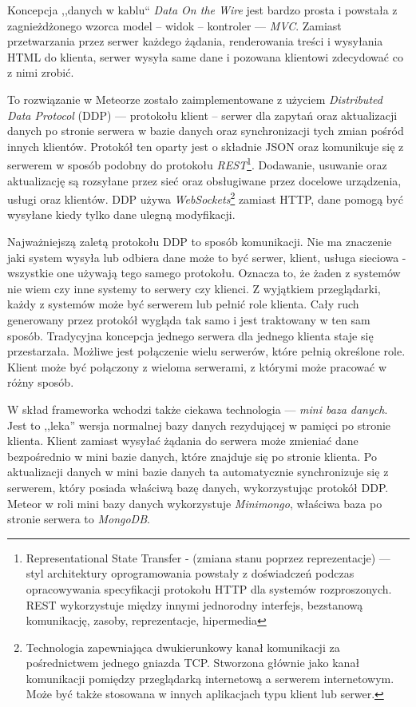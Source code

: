Koncepcja ,,danych w kablu`` \emph{Data On the Wire} jest bardzo prosta i powstała z zagnieżdżonego wzorca model -- widok -- kontroler --- \textit{MVC}. Zamiast przetwarzania przez serwer każdego żądania, renderowania treści i wysyłania HTML do klienta, serwer wysyła same dane i pozowana klientowi zdecydować co z nimi zrobić\cite{strack15}.

To rozwiązanie w Meteorze zostało zaimplementowane z użyciem \emph{Distributed Data Protocol} (DDP) --- protokołu klient -- serwer dla zapytań oraz aktualizacji danych po stronie serwera w bazie danych oraz synchronizacji tych zmian pośród innych klientów. Protokół ten oparty jest o składnie JSON oraz komunikuje się z serwerem w sposób podobny do protokołu \emph{REST}\footnote{Representational State Transfer - (zmiana stanu poprzez reprezentacje) --- styl architektury oprogramowania powstały z doświadczeń podczas opracowywania specyfikacji protokołu HTTP dla systemów rozproszonych. REST wykorzystuje między innymi jednorodny interfejs, bezstanową komunikację, zasoby, reprezentacje, hipermedia\cite{restWiki}}. Dodawanie, usuwanie oraz aktualizację są rozsyłane przez sieć oraz obsługiwane przez docelowe urządzenia, usługi oraz klientów. DDP używa \emph{WebSockets}\footnote{Technologia zapewniająca dwukierunkowy kanał komunikacji za pośrednictwem jednego gniazda TCP. Stworzona głównie jako kanał komunikacji pomiędzy przeglądarką internetową a serwerem internetowym. Może być także stosowana w innych aplikacjach typu klient lub serwer.\cite{wsWiki}} zamiast HTTP, dane pomogą być wysyłane kiedy tylko dane ulegną modyfikacji\cite{strack15}.

Najważniejszą zaletą protokołu DDP to sposób komunikacji. Nie ma znaczenie jaki system wysyła lub odbiera dane może to być serwer, klient, usługa sieciowa - wszystkie one używają tego samego protokołu. Oznacza to, że żaden z systemów nie wiem czy inne systemy to serwery czy klienci. Z wyjątkiem przeglądarki, każdy z systemów może być serwerem lub pełnić role klienta. Cały ruch generowany przez protokół wygląda tak samo i jest traktowany w ten sam sposób. Tradycyjna koncepcja jednego serwera dla jednego klienta staje się przestarzała. Możliwe jest połączenie wielu serwerów, które pełnią określone role. Klient może być połączony z wieloma serwerami, z którymi może pracować w różny sposób\cite{strack15}. 

W skład frameworka wchodzi także ciekawa technologia --- \emph{mini baza danych}. Jest to ,,leka'' wersja normalnej bazy danych rezydującej w pamięci po stronie klienta. Klient zamiast wysyłać żądania do serwera może zmieniać dane bezpośrednio w mini bazie danych, które znajduje się po stronie klienta. Po aktualizacji danych w mini bazie danych ta automatycznie synchronizuje się z serwerem, który posiada właściwą bazę danych, wykorzystując protokół DDP. Meteor w roli mini bazy danych wykorzystuje \emph{Minimongo}, właściwa baza po stronie serwera to \emph{MongoDB}\cite{strack15}.

